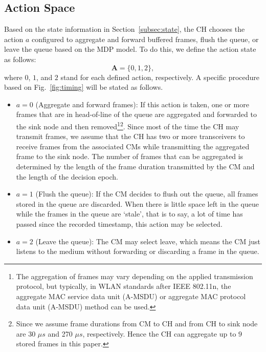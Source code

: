 \documentclass[journal]{IEEEtran}
\begin{document}
\subsection{Action Space}
\label{subsec:action}
Based on the state information in Section~\ref{subsec:state}, the CH chooses the action $a$ configured to aggregate and forward buffered frames, flush the queue, or leave the queue based on the MDP model. To do this, we define the action state as follows:
\begin{equation}
    \mathbf{A} = \{ 0, 1, 2\},
\label{eq:A}
\end{equation}
where $0$, $1$, and $2$ stand for each defined action, respectively. A specific procedure based on Fig.~\ref{fig:timing} will be stated as follows.
\begin{itemize}
    \item $a=0$ (Aggregate and forward frames): If this action is taken, one or more frames that are in head-of-line of the queue are aggregated and forwarded to the sink node and then removed\footnote{The aggregation of frames may vary depending on the applied transmission protocol, but typically, in WLAN standards after IEEE 802.11n, the aggregate MAC service data unit (A-MSDU) or aggregate MAC protocol data unit (A-MSDU) method can be used.}\footnote{Since we assume frame durations from CM to CH and from CH to sink node are 30 $\mu s$ and 270 $\mu s$, respectively. Hence the CH can aggregate up to $9$ stored frames in this paper.}. Since most of the time the CH may transmit frames, we assume that the CH has two or more transceivers to receive frames from the associated CMs while transmitting the aggregated frame to the sink node. The number of frames that can be aggregated is determined by the length of the frame duration transmitted by the CM and the length of the decision epoch.
    \item $a=1$ (Flush the queue): If the CM decides to flush out the queue, all frames stored in the queue are discarded. When there is little space left in the queue while the frames in the queue are `stale', that is to say, a lot of time has passed since the recorded timestamp, this action may be selected. 
    \item $a=2$ (Leave the queue): The CM may select leave, which means the CM just listens to the medium without forwarding or discarding a frame in the queue.
\end{itemize}
\end{document}

